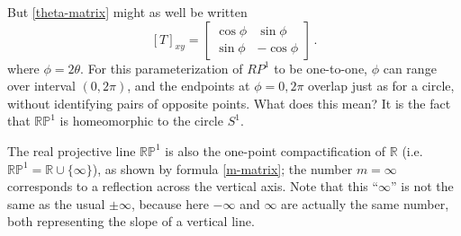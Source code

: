 \documentclass[12pt]{article}
\newcommand{\real}{\mathbb{R}}
\newcommand{\RPone}{\mathbb{RP}^1}
\begin{document}
But \eqref{theta-matrix} might as well be written
\begin{equation}\label{phi-matrix}
[T]_{xy} = \begin{bmatrix}
\cos \phi & \sin \phi \\
\sin \phi & -\cos \phi
\end{bmatrix}\,.
\end{equation}
where $\phi = 2\theta$. For this parameterization of $RP^1$ to be one-to-one,
$\phi$ can range over interval $(0, 2\pi)$, and the endpoints at $\phi = 0, 2\pi$ overlap just
as for a circle, without identifying pairs of opposite points.  What does this mean?  It is the fact that $\RPone$ is homeomorphic to the circle $S^1$.

The real projective line $\RPone$ is also the one-point compactification of $\real$
(i.e. $\RPone = \real \cup \{ \infty \}$),
as shown by formula \eqref{m-matrix}; the number $m = \infty$ corresponds to 
a reflection across the vertical axis.  Note that this ``$\infty$''
is not the same as the usual $\pm \infty$, because here $-\infty$ and $\infty$
are actually the same number, both representing the slope of a vertical line.
\end{document}

